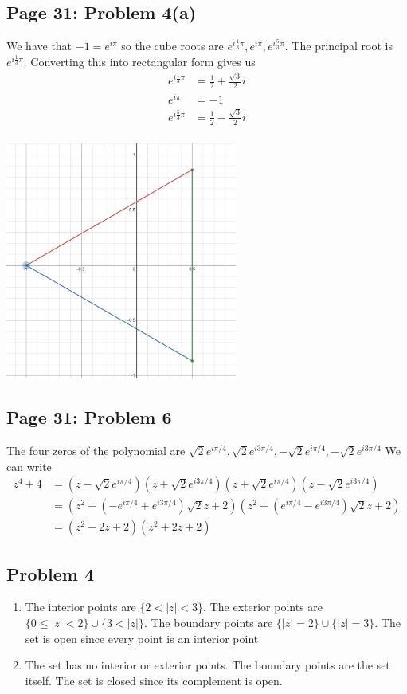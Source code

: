 \documentclass{article}
\begin{document}
\subsection*{Page 31: Problem 4(a)}
We have that $-1 = e^{i\pi}$ so the cube roots are 
$e^{i\frac{1}{3}\pi}, e^{i\pi}, e^{i\frac{5}{3}\pi}$.
The principal root is $e^{i\frac{1}{3}\pi}$.
Converting this into rectangular form gives us 
\begin{align*}
	e^{i\frac{1}{3}\pi} &= \frac{1}{2} + \frac{\sqrt{3}}{2}i\\
	e^{i\pi} &= -1 \\
	e^{i\frac{5}{3}\pi} &= \frac{1}{2} - \frac{\sqrt{3}}{2}i\\
\end{align*}
\begin{center}
	\includegraphics[width=3in]{problem2.png}
\end{center}
\subsection*{Page 31: Problem 6}
The four zeros of the polynomial are 
$\sqrt{2}e^{i\pi/4}, \sqrt{2}e^{i3\pi/4}, -\sqrt{2}e^{i\pi/4}, -\sqrt{2}e^{i3\pi/4}$
We can write
\begin{align*}
	z^4+4 &= (z-\sqrt{2}e^{i\pi/4})(z+ \sqrt{2}e^{i3\pi/4})(z+\sqrt{2}e^{i\pi/4})(z- \sqrt{2}e^{i3\pi/4})\\
	&= (z^2+(-e^{i\pi/4}+e^{i3\pi/4})\sqrt{2}z+2)(z^2+(e^{i\pi/4}-e^{i3\pi/4})\sqrt{2}z+2) \\
	&= (z^2-2z+2)(z^2+2z+2)
\end{align*}
\subsection*{Problem 4}
\begin{enumerate}
	\item The interior points are $\{2<|z|<3\}$.
	The exterior points are $\{0 \leq |z| < 2\} \cup \{3 < |z|\}$.
	The boundary points are $\{|z| = 2\} \cup \{|z| = 3\}$.
	The set is open since every point is an interior point
	\item The set has no interior or exterior points.
	The boundary points are the set itself.
	The set is closed since its complement is open.
\end{enumerate}
\end{document}
